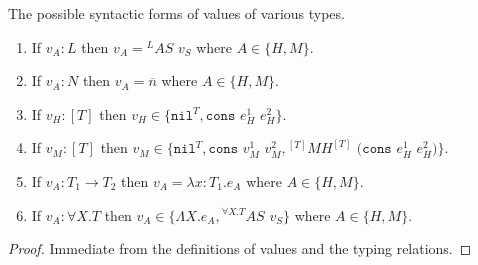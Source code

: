 \begin{lemma}
\label{cf}
The possible syntactic forms of values of various types.
\begin{enumerate}
\item If $v_{A}:L$ then $v_{A}={^{L}A}S$ $v_{S}$ where $A\in\lbrace H,M\rbrace$.
\item If $v_{A}:N$ then $v_{A}=\overline{n}$ where $A\in\lbrace H,M\rbrace$.
\item If $v_{H}:[T]$ then $v_{H}\in\lbrace\mathtt{nil}^{T},\mathtt{cons}$ $e_{H}^{1}$ $e_{H}^{2}\rbrace$.
\item If $v_{M}:[T]$ then $v_{M}\in\lbrace\mathtt{nil}^{T},\mathtt{cons}$ $v_{M}^{1}$ $v_{M}^{2},{^{[T]}M}H^{[T]}$ $(\mathtt{cons}$ $e_{H}^{1}$ $e_{H}^{2})\rbrace$.
\item If $v_{A}:T_{1}\rightarrow T_{2}$ then $v_{A}=\lambda x:T_{1}.e_{A}$ where $A\in\lbrace H,M\rbrace$.
\item If $v_{A}:\forall X.T$ then $v_{A}\in\lbrace\Lambda X.e_{A},{^{\forall X.T}A}S$ $v_{S}\rbrace$ where $A\in\lbrace H,M\rbrace$.
\end{enumerate}
\begin{proof}
Immediate from the definitions of values and the typing relations.
\end{proof}
\end{lemma}
